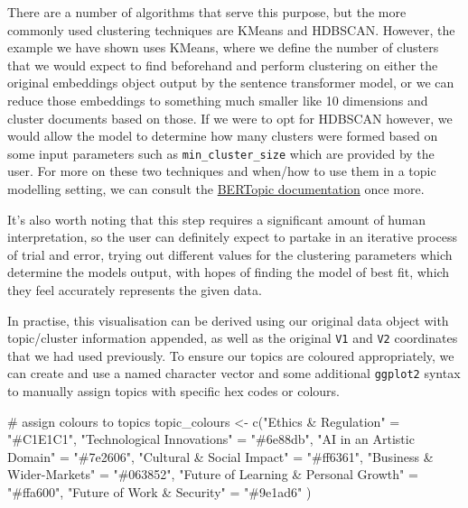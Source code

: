 \documentclass[
  letterpaper,
  DIV=11,
  numbers=noendperiod]{scrreprt}
\newenvironment{Shaded}{\begin{snugshade}}{\end{snugshade}}
\newcommand{\CommentTok}[1]{\textcolor[rgb]{0.37,0.37,0.37}{#1}}
\newcommand{\FunctionTok}[1]{\textcolor[rgb]{0.28,0.35,0.67}{#1}}
\newcommand{\NormalTok}[1]{\textcolor[rgb]{0.00,0.23,0.31}{#1}}
\newcommand{\OtherTok}[1]{\textcolor[rgb]{0.00,0.23,0.31}{#1}}
\newcommand{\StringTok}[1]{\textcolor[rgb]{0.13,0.47,0.30}{#1}}
\begin{document}
There are a number of algorithms that serve this purpose, but the more
commonly used clustering techniques are KMeans and HDBSCAN. However, the
example we have shown uses KMeans, where we define the number of
clusters that we would expect to find beforehand and perform clustering
on either the original embeddings object output by the sentence
transformer model, or we can reduce those embeddings to something much
smaller like 10 dimensions and cluster documents based on those. If we
were to opt for HDBSCAN however, we would allow the model to determine
how many clusters were formed based on some input parameters such as
\texttt{min\_cluster\_size} which are provided by the user. For more on
these two techniques and when/how to use them in a topic modelling
setting, we can consult the
\href{https://maartengr.github.io/BERTopic/getting_started/clustering/clustering.html\#hdbscan}{BERTopic
documentation} once more.

It's also worth noting that this step requires a significant amount of
human interpretation, so the user can definitely expect to partake in an
iterative process of trial and error, trying out different values for
the clustering parameters which determine the models output, with hopes
of finding the model of best fit, which they feel accurately represents
the given data.

In practise, this visualisation can be derived using our original data
object with topic/cluster information appended, as well as the original
\texttt{V1} and \texttt{V2} coordinates that we had used previously. To
ensure our topics are coloured appropriately, we can create and use a
named character vector and some additional \texttt{ggplot2} syntax to
manually assign topics with specific hex codes or colours.

\begin{Shaded}
\begin{Highlighting}[]
\CommentTok{\# assign colours to topics}
\NormalTok{topic\_colours }\OtherTok{\textless{}{-}} \FunctionTok{c}\NormalTok{(}\StringTok{"Ethics \& Regulation"} \OtherTok{=} \StringTok{"\#C1E1C1"}\NormalTok{,}
                   \StringTok{"Technological Innovations"} \OtherTok{=} \StringTok{"\#6e88db"}\NormalTok{, }
                   \StringTok{"AI in an Artistic Domain"} \OtherTok{=} \StringTok{"\#7e2606"}\NormalTok{,}
                   \StringTok{"Cultural \& Social Impact"} \OtherTok{=} \StringTok{"\#ff6361"}\NormalTok{,}
                   \StringTok{"Business \& Wider{-}Markets"} \OtherTok{=} \StringTok{"\#063852"}\NormalTok{,}
                   \StringTok{"Future of Learning \& Personal Growth"} \OtherTok{=} \StringTok{"\#ffa600"}\NormalTok{,}
                   \StringTok{"Future of Work \& Security"} \OtherTok{=} \StringTok{"\#9e1ad6"}
\NormalTok{                   )}
\end{Highlighting}
\end{Shaded}
\end{document}
